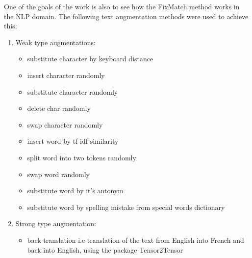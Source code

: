 \documentclass[12pt]{article}
\theoremstyle{definition}
\DeclareRobustCommand{\[}{\begin{equation}}
\DeclareRobustCommand{\]}{\end{equation}}
\begin{document}
\setlength{\parindent}{4ex}One of the goals of the work is also to see how the FixMatch method works in the NLP domain.
The following text augmentation methods were used to achieve this:
\begin{enumerate}
    \item Weak type augmentations:
        \begin{itemize}
            \item substitute character by keyboard distance
            \item insert character randomly
            \item substitute character randomly
            \item delete char randomly
            \item swap character randomly
            \item insert word by tf-idf similarity
            \item split word into two tokens randomly
            \item swap word randomly
            \item substitute word by it's antonym
            \item substitute word by spelling mistake from special words dictionary
        \end{itemize}
    \item Strong type augmentation: 
        \begin{itemize}
            \item back translation i.e translation of the text from English into French and back into English, using the package Tensor2Tensor \cite{tensor2tensor}
        \end{itemize}
\end{enumerate}
\end{document}
